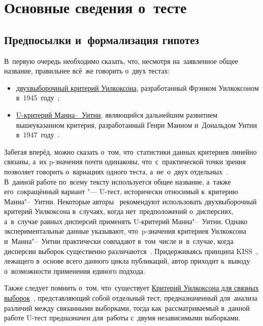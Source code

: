 \documentclass[]{scrartcl}
\begin{document}
\section{Основные сведения о~тесте}
\subsection{Предпосылки и~формализация гипотез}
В~первую очередь необходимо сказать, что, несмотря на~заявленное общее название, правильнее всё~же говорить о~двух тестах:
\begin{itemize}
	\item \href{http://www.machinelearning.ru/wiki/index.php?title=Критерий_Уилкоксона_двухвыборочный}{двухвыборочный критерий Уилкоксона}, разработанный Фрэнком Уилкоксоном в~1945~году~\cite{MLRU:Wilcoxon-test};
	\item \href{http://www.machinelearning.ru/wiki/index.php?title=Критерий_Уилкоксона-Манна"--~Уитни}{U-критерий Манна--~Уитни}, являющийся дальнейшим развитием вышеуказанном критерия, разработанный Генри Манном и~Дональдом Уитни в~1947~году~\cite{MLRU:Mann-Whitney}.
\end{itemize}
Забегая вперёд, можно сказать о~том, что~статистики данных критериев линейно связаны, а~их p-значения почти одинаковы, что~с~практической точки зрения позволяет говорить о~вариациях одного теста, а~не~о~двух отдельных~\cite{MLRU:Wilcoxon-test}. В~данной работе по~всему тексту используется общее название, а~также его~сокращённый вариант "--- U-тест, исторически относимый к~критерию Манна"--~Уитни. Некоторые авторы~\cite{Kobzarq-prikl-mathstat} рекомендуют использовать двухвыборочный критерий Уилкоксона в~случаях, когда нет~предположений о~дисперсиях, а~в~случае равных дисперсий применять U-критерий Манна"--~Уитни. Однако экспериментальные данные указывают, что~p-значения критериев Уилкоксона и~Манна"--~Уитни практически совпадают в~том~числе и~в~случае, когда дисперсии выборок существенно различаются~\cite{MLRU:Wilcoxon-test}. Придерживаясь принципа KISS~\cite{KISS-principle}, лежащего в~основе всего данного цикла публикаций, автор приходит к~выводу о~возможности применения единого подхода. 

Также следует помнить о~том, что~существует \href{http://www.machinelearning.ru/wiki/index.php?title=Критерий_Уилкоксона_для_связных_выборок}{Критерий Уилкоксона для связных выборок}~\cite{Wilcoxon-signed-rank-test}, представляющий собой отдельный тест, предназначенный для~анализа различий между связанными выборками, тогда как~рассматриваемый в~данной работе U-тест предназначен для~работы с~двумя независимыми выборками.
\end{document}
